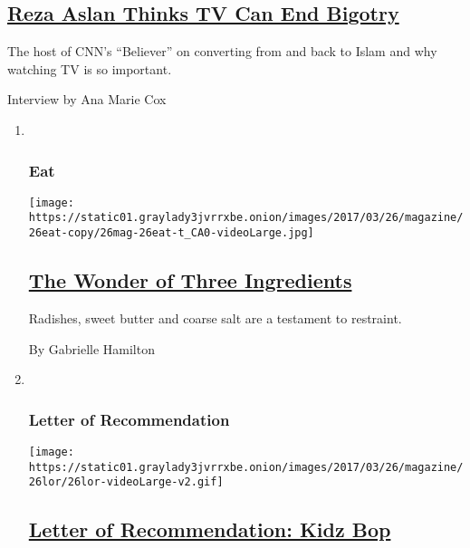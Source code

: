 \begin{enumerate}
  \hypertarget{reza-aslan-thinks-tv-can-end-bigotry}{%
  \subsection{\texorpdfstring{\href{/2017/03/22/magazine/reza-aslan-thinks-tv-can-end-bigotry.html}{Reza
  Aslan Thinks TV Can End
  Bigotry}}{Reza Aslan Thinks TV Can End Bigotry}}\label{reza-aslan-thinks-tv-can-end-bigotry}}

  The host of CNN's ``Believer'' on converting from and back to Islam
  and why watching TV is so important.

  Interview by Ana Marie Cox
\end{enumerate}

\begin{enumerate}
\def\labelenumi{\arabic{enumi}.}
\item ~
  \hypertarget{eat}{%
  \subsubsection{Eat}\label{eat}}

  \texttt{[image: https://static01.graylady3jvrrxbe.onion/images/2017/03/26/magazine/26eat-copy/26mag-26eat-t\_CA0-videoLarge.jpg]}

  \hypertarget{the-wonder-of-three-ingredients}{%
  \subsection{\texorpdfstring{\href{/2017/03/23/magazine/the-wonder-of-three-ingredients.html}{The
  Wonder of Three
  Ingredients}}{The Wonder of Three Ingredients}}\label{the-wonder-of-three-ingredients}}

  Radishes, sweet butter and coarse salt are a testament to restraint.

  By Gabrielle Hamilton
\item ~
  \hypertarget{letter-of-recommendation}{%
  \subsubsection{Letter of
  Recommendation}\label{letter-of-recommendation}}

  \texttt{[image: https://static01.graylady3jvrrxbe.onion/images/2017/03/26/magazine/26lor/26lor-videoLarge-v2.gif]}

  \hypertarget{letter-of-recommendation-kidz-bop}{%
  \subsection{\texorpdfstring{\href{/2017/03/23/magazine/letter-of-recommendation-kidz-bop.html}{Letter
  of Recommendation: Kidz
  Bop}}{Letter of Recommendation: Kidz Bop}}\label{letter-of-recommendation-kidz-bop}}


\end{enumerate}
